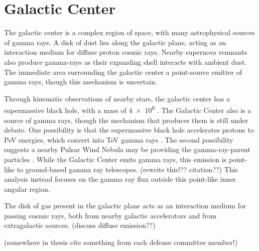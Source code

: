 \section{Galactic Center}
  The galactic center is a complex region of space, with many astrophysical sources of gamma rays.
  A disk of dust lies along the galactic plane, acting as an interaction medium for diffuse proton cosmic rays.
  Nearby supernova remnants also produce gamma-rays as their expanding shell interacts with ambient dust.
  The immediate area surrounding the galactic center a point-source emitter of gamma rays, though this mechanism is uncertain.

  Through kinematic observations of nearby stars, the galactic center has a supermassive black hole, with a mass of \SI{4e6}{\Msol} \cite{sgra_massdist}.
  The Galactic Center also is a source of \TeV{} gamma rays, though the mechanism that produces them is still under debate.
  One possibility is that the supermassive black hole accelerates protons to PeV energies, which convert into TeV gamma rays \cite{gc_pevatron}.
  The second possibility suggests a nearby Pulsar Wind Nebula may be providing the gamma-ray-parent particles \cite{gc_pulsars}.
  While the Galactic Center emits gamma rays, this emission is point-like to ground-based gamma ray telescopes. {\color{red}(rewrite this!?? citation??)}
  This analysis instead focuses on the gamma ray flux outside this point-like inner angular region.

  The disk of gas present in the galactic plane acts as an interaction medium for passing cosmic rays, both from nearby galactic accelerators and from extragalactic sources.
  {\color{red}(discuss diffuse emission??)}


  {\color{red}(somewhere in thesis cite something from each defense committee member!)}


